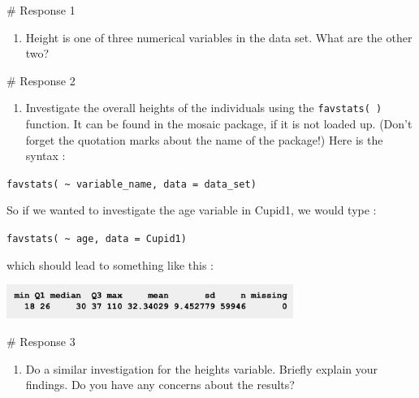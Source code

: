 \documentclass[
  letterpaper,
  DIV=11,
  numbers=noendperiod]{scrreprt}
\newenvironment{Shaded}{\begin{snugshade}}{\end{snugshade}}
\newcommand{\CommentTok}[1]{\textcolor[rgb]{0.37,0.37,0.37}{#1}}
\providecommand{\tightlist}{%
  \setlength{\itemsep}{0pt}\setlength{\parskip}{0pt}}\usepackage{longtable,booktabs,array}
\begin{document}
\begin{Shaded}
\begin{Highlighting}[]
\CommentTok{\# Response 1}
\end{Highlighting}
\end{Shaded}

\begin{enumerate}
\def\labelenumi{\arabic{enumi}.}
\setcounter{enumi}{1}
\tightlist
\item
  Height is one of three numerical variables in the data set. What are
  the other two?
\end{enumerate}

\begin{Shaded}
\begin{Highlighting}[]
\CommentTok{\# Response 2}
\end{Highlighting}
\end{Shaded}

\begin{enumerate}
\def\labelenumi{\arabic{enumi}.}
\setcounter{enumi}{2}
\tightlist
\item
  Investigate the overall heights of the individuals using the
  \texttt{favstats(\ )} function. It can be found in the mosaic package,
  if it is not loaded up. (Don't forget the quotation marks about the
  name of the package!) Here is the syntax :
\end{enumerate}

\texttt{favstats(\ \textasciitilde{}\ variable\_name,\ data\ =\ data\_set)}

So if we wanted to investigate the age variable in Cupid1, we would type
:

\texttt{favstats(\ \textasciitilde{}\ age,\ data\ =\ Cupid1)}

which should lead to something like this :

\includegraphics[width=0.7\textwidth,height=\textheight]{./images/IL4_1.jpg}

\begin{Shaded}
\begin{Highlighting}[]
\CommentTok{\# Response 3}
\end{Highlighting}
\end{Shaded}

\begin{enumerate}
\def\labelenumi{\arabic{enumi}.}
\setcounter{enumi}{3}
\tightlist
\item
  Do a similar investigation for the heights variable. Briefly explain
  your findings. Do you have any concerns about the results?
\end{enumerate}
\end{document}
